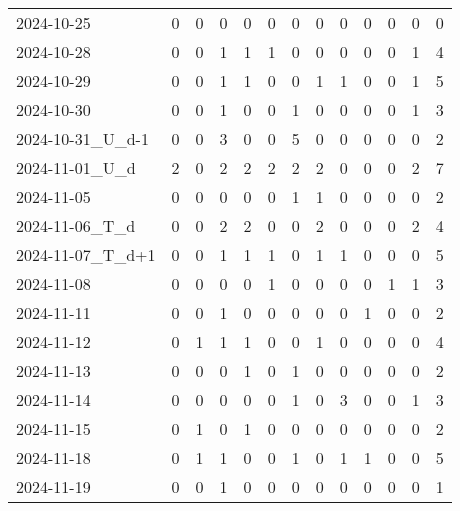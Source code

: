 \documentclass[dvipdfmx,oneside]{article}
\begin{document}
\begin{longtable}{lcccccccccccc}
        2024-10-25 &     0 &     0 &     0 &     0 &     0 &     0 &     0 &     0 &     0 &     0 &     0 &      0 \\
        2024-10-28 &     0 &     0 &     1 &     1 &     1 &     0 &     0 &     0 &     0 &     0 &     1 &      4 \\
        2024-10-29 &     0 &     0 &     1 &     1 &     0 &     0 &     1 &     1 &     0 &     0 &     1 &      5 \\
        2024-10-30 &     0 &     0 &     1 &     0 &     0 &     1 &     0 &     0 &     0 &     0 &     1 &      3 \\
2024-10-31\_U\_d-1 &     0 &     0 &     3 &     0 &     0 &     5 &     0 &     0 &     0 &     0 &     0 &      2 \\
  2024-11-01\_U\_d &     2 &     0 &     2 &     2 &     2 &     2 &     2 &     0 &     0 &     0 &     2 &      7 \\
        2024-11-05 &     0 &     0 &     0 &     0 &     0 &     1 &     1 &     0 &     0 &     0 &     0 &      2 \\
  2024-11-06\_T\_d &     0 &     0 &     2 &     2 &     0 &     0 &     2 &     0 &     0 &     0 &     2 &      4 \\
2024-11-07\_T\_d+1 &     0 &     0 &     1 &     1 &     1 &     0 &     1 &     1 &     0 &     0 &     0 &      5 \\
        2024-11-08 &     0 &     0 &     0 &     0 &     1 &     0 &     0 &     0 &     0 &     1 &     1 &      3 \\
        2024-11-11 &     0 &     0 &     1 &     0 &     0 &     0 &     0 &     0 &     1 &     0 &     0 &      2 \\
        2024-11-12 &     0 &     1 &     1 &     1 &     0 &     0 &     1 &     0 &     0 &     0 &     0 &      4 \\
        2024-11-13 &     0 &     0 &     0 &     1 &     0 &     1 &     0 &     0 &     0 &     0 &     0 &      2 \\
        2024-11-14 &     0 &     0 &     0 &     0 &     0 &     1 &     0 &     3 &     0 &     0 &     1 &      3 \\
        2024-11-15 &     0 &     1 &     0 &     1 &     0 &     0 &     0 &     0 &     0 &     0 &     0 &      2 \\
        2024-11-18 &     0 &     1 &     1 &     0 &     0 &     1 &     0 &     1 &     1 &     0 &     0 &      5 \\
        2024-11-19 &     0 &     0 &     1 &     0 &     0 &     0 &     0 &     0 &     0 &     0 &     0 &      1 \\

\end{longtable}
\end{document}
